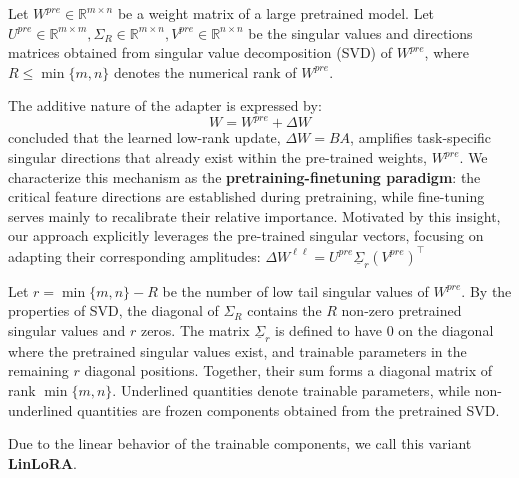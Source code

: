 Let $W^{pre} \in \mathbb{R}^{m \times n}$ be a weight matrix of a large pretrained model. Let $U^{pre} \in \mathbb{R}^{m \times m}, \Sigma_R \in \mathbb{R}^{m \times n}, V^{pre} \in \mathbb{R}^{n \times n}$ be the singular values and directions matrices obtained from singular value decomposition (SVD) of $W^{pre}$, where $R \leq \min\{m,n\}$ denotes the numerical rank of $W^{pre}$.

The additive nature of the adapter is expressed by:
\[
W = W^{pre} + \Delta W
\]
\citet{hu2022lora} concluded that the learned low-rank update, $\Delta W = BA$, amplifies task-specific singular directions that already exist within the pre-trained weights, $W^{pre}$. We characterize this mechanism as the \textbf{pretraining-finetuning paradigm}\label{def}: the critical feature directions are established during pretraining, while fine-tuning serves mainly to recalibrate their relative importance. Motivated by this insight, our approach explicitly leverages the pre-trained singular vectors, focusing on adapting their corresponding amplitudes:
$\Delta W^{\ell \ell} = U^{pre} \underline{\Sigma}_r (V^{pre})^\top
$

Let $r = \min\{m,n\} - R$ be the number of low tail singular values of $W^{pre}$. By the properties of SVD, the diagonal of $\Sigma_R$ contains the $R$ non-zero pretrained singular values and $r$ zeros. The matrix $\underline{\Sigma}_r$ is defined to have $0$ on the diagonal where the pretrained singular values exist, and trainable parameters in the remaining $r$ diagonal positions. Together, their sum forms a diagonal matrix of rank $\min\{m,n\}$. Underlined quantities denote trainable parameters, while non-underlined quantities are frozen components obtained from the pretrained SVD.

Due to the linear behavior of the trainable components, we call this variant \textbf{LinLoRA}.
